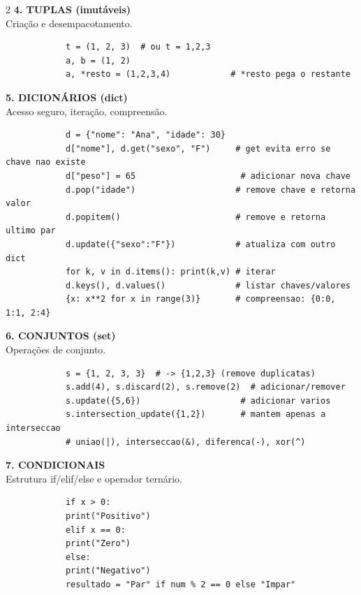 \documentclass[a4paper]{article}
\begin{document}
\begin{multicols}{2}
		\noindent\textbf{4. TUPLAS (imutáveis)} \\
		Criação e desempacotamento.
		\begin{lstlisting}
			t = (1, 2, 3)  # ou t = 1,2,3
			a, b = (1, 2)
			a, *resto = (1,2,3,4)            # *resto pega o restante
		\end{lstlisting}
		
		\noindent\textbf{5. DICIONÁRIOS (dict)} \\
		Acesso seguro, iteração, compreensão.
		\begin{lstlisting}
			d = {"nome": "Ana", "idade": 30}
			d["nome"], d.get("sexo", "F")     # get evita erro se chave nao existe
			d["peso"] = 65                     # adicionar nova chave
			d.pop("idade")                    # remove chave e retorna valor
			d.popitem()                       # remove e retorna ultimo par
			d.update({"sexo":"F"})            # atualiza com outro dict
			for k, v in d.items(): print(k,v) # iterar
			d.keys(), d.values()              # listar chaves/valores
			{x: x**2 for x in range(3)}       # compreensao: {0:0, 1:1, 2:4}
		\end{lstlisting}
		
		\noindent\textbf{6. CONJUNTOS (set)} \\
		Operações de conjunto.
		\begin{lstlisting}
			s = {1, 2, 3, 3}  # -> {1,2,3} (remove duplicatas)
			s.add(4), s.discard(2), s.remove(2)  # adicionar/remover
			s.update({5,6})                    # adicionar varios
			s.intersection_update({1,2})       # mantem apenas a interseccao
			# uniao(|), interseccao(&), diferenca(-), xor(^)
		\end{lstlisting}
		
		\noindent\textbf{7. CONDICIONAIS} \\
		Estrutura if/elif/else e operador ternário.
		\begin{lstlisting}
			if x > 0:
			print("Positivo")
			elif x == 0:
			print("Zero")
			else:
			print("Negativo")
			resultado = "Par" if num % 2 == 0 else "Impar"
		\end{lstlisting}
		

\end{multicols}
\end{document}
